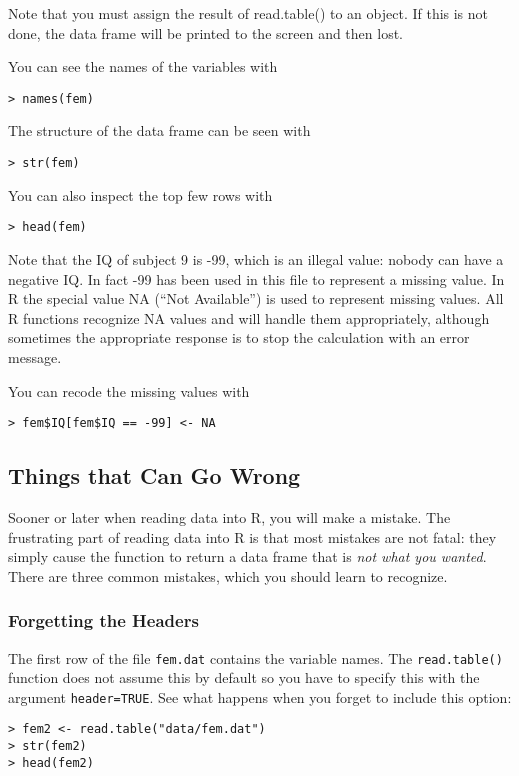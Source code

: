 \documentclass[12pt]{article}
\begin{document}
Note that you must assign the result of read.table() to an object. If this is not done, the data frame will be printed to the screen and then lost.

You can see the names of the variables with

\begin{verbatim}
> names(fem)
\end{verbatim}

The structure of the data frame can be seen with

\begin{verbatim}
> str(fem)
\end{verbatim}

You can also inspect the top few rows with

\begin{verbatim}
> head(fem)
\end{verbatim}

Note that the IQ of subject 9 is -99, which is an illegal value: nobody can have a negative IQ. In
fact -99 has been used in this file to represent a missing value. In R the special value NA (“Not
Available”) is used to represent missing values. All R functions recognize NA values and will
handle them appropriately, although sometimes the appropriate response is to stop the
calculation with an error message.

You can recode the missing values with

\begin{verbatim}
> fem$IQ[fem$IQ == -99] <- NA
\end{verbatim}

\subsection{Things that Can Go Wrong}
Sooner or later when reading data into R, you will make a mistake. The frustrating part of reading data into R is that most mistakes are not fatal: they simply cause the function to return a
data frame that is \emph{not what you wanted}. There are three common mistakes, which you should learn to recognize.

\subsubsection{Forgetting the Headers}
The first row of the file \texttt{fem.dat} contains the variable names. The \texttt{read.table()} function does
not assume this by default so you have to specify this with the argument \texttt{header=TRUE}. See what
happens when you forget to include this option:
\begin{verbatim}
> fem2 <- read.table("data/fem.dat")
> str(fem2)
> head(fem2)
\end{verbatim}
\end{document}
